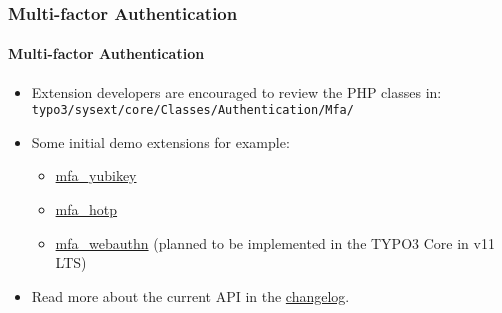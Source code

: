 %

\begin{frame}[fragile]
	\frametitle{Multi-factor Authentication}
	\framesubtitle{Multi-factor Authentication}

	\begin{itemize}


		\item Extension developers are encouraged to review the PHP classes in:\newline
			\small\texttt{typo3/sysext/core/Classes/Authentication/Mfa/}\normalsize

		\item Some initial demo extensions for example:

			\begin{itemize}\small
				\item \href{https://github.com/derhansen/mfa_yubikey}{mfa\_yubikey}
				\item \href{https://github.com/o-ba/mfa_hotp}{mfa\_hotp}
				\item \href{https://github.com/bnf/mfa_webauthn}{mfa\_webauthn} (planned to be implemented in the TYPO3 Core in v11 LTS)
			\end{itemize}\normalsize

		\item Read more about the current API in the
			\href{https://docs.typo3.org/c/typo3/cms-core/master/en-us/Changelog/11.1/Feature-93526-MultiFactorAuthentication.html}{changelog}.


	\end{itemize}

\end{frame}

